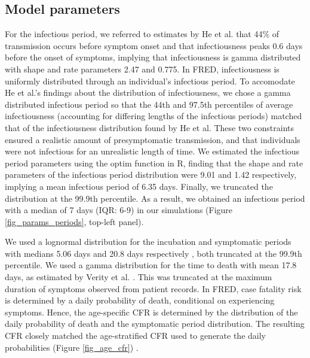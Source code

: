 \documentclass[11pt]{article}
\begin{document}
\subsection{Model parameters}
For the infectious period, we referred to estimates by He et al. that 44\% of transmission occurs before symptom onset and that infectiousness peaks 0.6 days before the onset of symptoms, implying that infectiousness is gamma distributed with shape and rate parameters 2.47 and 0.775\cite{He2020_Nature}. In FRED, infectiousness is uniformly distributed through an individual’s infectious period. To accomodate He et al.’s findings about the distribution of infectiousness, we chose a gamma distributed infectious period so that the 44th and 97.5th percentiles of average infectiousness (accounting for differing lengths of the infectious periods) matched that of the infectiousness distribution found by He et al. These two constraints ensured a realistic amount of presymptomatic transmission, and that individuals were not infectious for an unrealistic length of time. We estimated the infectious period parameters using the optim function in R, finding that the shape and rate parameters of the infectious period distribution were 9.01 and 1.42 respectively, implying a mean infectious period of 6.35 days. Finally, we truncated the distribution at the 99.9th percentile. As a result, we obtained an infectious period with a median of 7 days (IQR: 6-9) in our simulations (Figure \ref{fig_params_periods}, top-left panel). 

We used a lognormal distribution for the incubation and symptomatic periods with medians 5.06 days and 20.8 days respectively \cite{Lauer2020_Annals,Bi2020_LancetID}, both truncated at the 99.9th percentile. We used a gamma distribution for the time to death with mean 17.8 days, as estimated by Verity et al. \cite{Verity2020_LancetID}. This was truncated at the maximum duration of symptoms observed from patient records. In FRED, case fatality risk is determined by a daily probability of death, conditional on experiencing symptoms. Hence, the age-specific CFR is determined by the distribution of the daily probability of death and the symptomatic period distribution. The resulting CFR closely matched the age-stratified CFR used to generate the daily probabilities (Figure \ref{fig_age_cfr}) \cite{Wu2020_Nature}.
\end{document}
